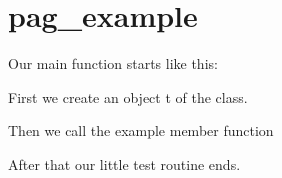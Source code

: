 \chapter{pag\+\_\+example}
\hypertarget{pag_example}{}\label{pag_example}
 Our main function starts like this\+: 
\begin{DoxyCodeInclude}{0}

\end{DoxyCodeInclude}
First we create an object {\ttfamily t} of the  class. 
\begin{DoxyCodeInclude}{0}

\end{DoxyCodeInclude}
Then we call the example member function 
\begin{DoxyCodeInclude}{0}

\end{DoxyCodeInclude}
After that our little test routine ends. 
\begin{DoxyCodeInclude}{0}

\end{DoxyCodeInclude}
